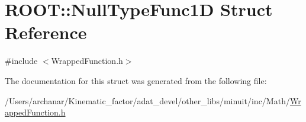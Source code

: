 \hypertarget{structROOT_1_1Math_1_1NullTypeFunc1D}{}\section{R\+O\+OT\+:\+:Null\+Type\+Func1D Struct Reference}
\label{structROOT_1_1Math_1_1NullTypeFunc1D}


{\ttfamily \#include $<$Wrapped\+Function.\+h$>$}



The documentation for this struct was generated from the following file\+:\begin{DoxyCompactItemize}
\item 
/\+Users/archanar/\+Kinematic\+\_\+factor/adat\+\_\+devel/other\+\_\+libs/minuit/inc/\+Math/\mbox{\hyperlink{other__libs_2minuit_2inc_2Math_2WrappedFunction_8h}{Wrapped\+Function.\+h}}\end{DoxyCompactItemize}
